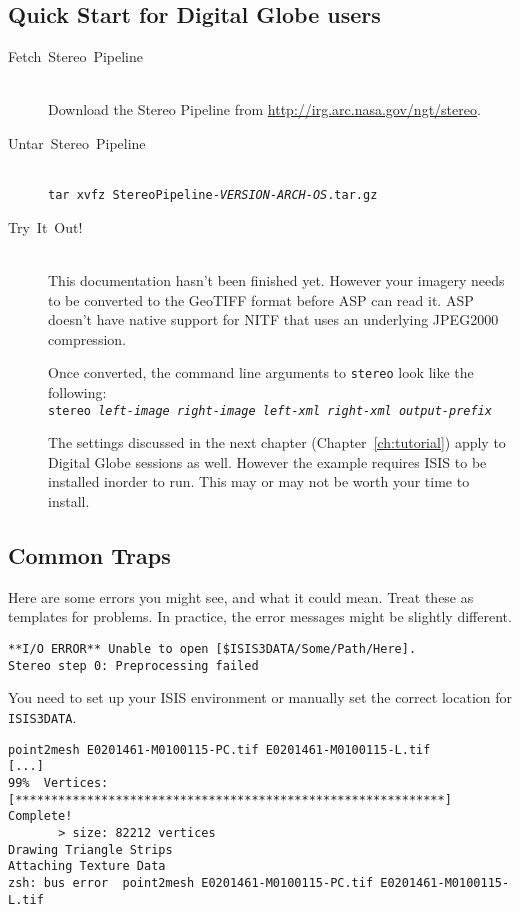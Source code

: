 \subsection{Quick Start for Digital Globe users}
\label{quickstartDG}
\begin{description}

\item[{Fetch~Stereo~Pipeline}] ~\\
Download the Stereo Pipeline from \url{http://irg.arc.nasa.gov/ngt/stereo}.

\item[{Untar~Stereo~Pipeline}] ~\\
\texttt{tar xvfz StereoPipeline-\textit{VERSION-ARCH-OS}.tar.gz}

\item [{Try~It~Out!}] ~\\
This documentation hasn't been finished yet. However
your imagery needs to be converted to the GeoTIFF format before ASP
can read it. ASP doesn't have native support for NITF that uses an
underlying JPEG2000 compression.

Once converted, the command line arguments to \texttt{stereo} look
like the following: ~\\
\texttt{stereo \textit{left-image} \textit{right-image} \textit{left-xml} \textit{right-xml} \textit{output-prefix}}

The settings discussed in the next chapter (Chapter~\ref{ch:tutorial})
apply to Digital Globe sessions as well. However the example requires
ISIS to be installed inorder to run. This may or may not be worth your
time to install.
\end{description}

\subsection{Common Traps}

Here are some errors you might see, and what it could mean. Treat
these as templates for problems.  In practice, the error messages might
be slightly different.

\begin{verbatim}
**I/O ERROR** Unable to open [$ISIS3DATA/Some/Path/Here].
Stereo step 0: Preprocessing failed
\end{verbatim}

You need to set up your ISIS environment or manually set the correct location for \texttt{ISIS3DATA}.

\begin{verbatim}
point2mesh E0201461-M0100115-PC.tif E0201461-M0100115-L.tif
[...]
99%  Vertices:   [************************************************************] Complete!
       > size: 82212 vertices
Drawing Triangle Strips
Attaching Texture Data
zsh: bus error  point2mesh E0201461-M0100115-PC.tif E0201461-M0100115-L.tif
\end{verbatim}

